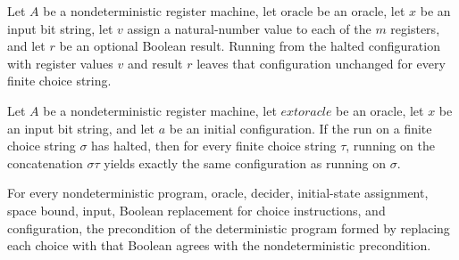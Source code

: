 \begin{lemma}
\label{Complexity.LogProg.narun_halted}
\leanok
{}
Let $A$ be a nondeterministic register machine, let $\text{oracle}$ be an oracle, let
$x$ be an input bit string, let $v$ assign a natural-number value to each of the $m$
registers, and let $r$ be an optional Boolean result. Running from the halted
configuration with register values $v$ and result $r$ leaves that configuration
unchanged for every finite choice string.
\end{lemma}

\begin{lemma}
\label{Complexity.LogProg.narun_append_of_halted}
\leanok
{}
Let $A$ be a nondeterministic register machine, let $	ext{oracle}$ be an oracle, let $x$
be an input bit string, and let $a$ be an initial configuration. If the run on a finite
choice string $\sigma$ has halted, then for every finite choice string $\tau$, running
on the concatenation $\sigma\tau$ yields exactly the same configuration as running on
$\sigma$.
\end{lemma}

\begin{lemma}
\label{Complexity.LogProg.pre_detPart}
\leanok
{}
For every nondeterministic program, oracle, decider, initial-state assignment, space
bound, input, Boolean replacement for choice instructions, and configuration, the
precondition of the deterministic program formed by replacing each choice with that
Boolean agrees with the nondeterministic precondition.
\end{lemma}

